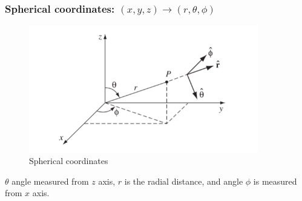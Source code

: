 \documentclass[12pt,a4paper,twoside]{article}
\begin{document}
	\subsubsection{Spherical coordinates: \((x,y,z)\rightarrow(r,\theta,\phi)\)}
	
	\begin{figure}[ht]
		\centering
		\includegraphics[width=10cm]{250-Revision/spherical.png}
		\caption{Spherical coordinates}
		\label{fig:spherical}
	\end{figure}
	$\theta$ angle measured from $z$ axis, $r$ is the radial distance, and angle $\phi$ is measured from $x$ axis.\\
	
\end{document}
